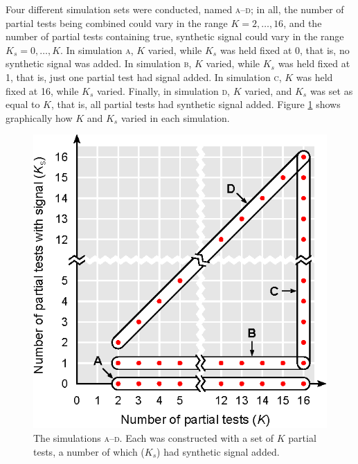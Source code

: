 Four different simulation sets were conducted, named \textsc{a}--\textsc{d}; in all, the number of partial tests being combined could vary in the range $K = 2, \ldots, 16$, and the number of partial tests containing true, synthetic signal could vary in the range $K_s = 0, \ldots, K$. In simulation \textsc{a}, $K$ varied, while $K_s$ was held fixed at 0, that is, no synthetic signal was added. In simulation \textsc{b}, $K$ varied, while $K_s$ was held fixed at 1, that is, just one partial test had signal added. In simulation \textsc{c}, $K$ was held fixed at 16, while $K_s$ varied. Finally, in simulation \textsc{d}, $K$ varied, and $K_s$ was set as equal to $K$, that is, all partial tests had synthetic signal added. Figure \ref{fig:comb:simulations} shows graphically how $K$ and $K_s$ varied in each simulation.

\begin{figure}[t]
\begin{center}
\centerline{\includegraphics{images/simulations.eps}}
\end{center}
\vspace{-3mm}
\caption[Overview of the main simulation parameters.]{The simulations \textsc{a}--\textsc{d}. Each was constructed with a set of $K$ partial tests, a number of which ($K_s$) had synthetic signal added.}
\label{fig:comb:simulations}
\end{figure}

